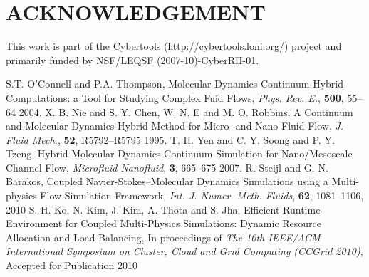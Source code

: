 \documentclass{CFD2010paper}
\begin{document}
\section*{ACKNOWLEDGEMENT}
This work is part of the Cybertools (\underline {http://cybertools.loni.org/}) project and primarily funded by NSF/LEQSF (2007-10)-CyberRII-01.


\begin{thebibliography}{99}



 S.T. O'Connell and P.A. Thompson, Molecular Dynamics Continuum Hybrid Computations: a Tool for Studying Complex Fuid Flows, \textit{Phys. Rev. E.}, \textbf{500}, 55--64 {2004}.
 X. B. Nie and S. Y. Chen, W. N. E and M. O. Robbins, A Continuum and Molecular Dynamics Hybrid Method for Micro- and Nano-Fluid Flow, \textit{J. Fluid Mech.}, \textbf{52}, R5792--R5795 {1995}.
 T. H. Yen and C. Y. Soong and P. Y. Tzeng, Hybrid Molecular Dynamics-Continuum Simulation for Nano/Mesoscale Channel Flow, \textit{Microfluid Nanofluid}, \textbf{3}, 665--675 {2007}.
 R. Steijl and G. N. Barakos, Coupled Navier-Stokes--Molecular Dynamics Simulations using a Multi-physics Flow Simulation Framework, \textit{Int. J. Numer. Meth. Fluids}, \textbf{62}, 1081--1106, {2010}
 S.-H. Ko, N. Kim, J. Kim, A. Thota and S. Jha, Efficient Runtime Environment for Coupled Multi-Physics Simulations: Dynamic Resource Allocation and Load-Balancing, In proceedings of \textit{The 10th IEEE/ACM International Symposium on Cluster, Cloud and Grid Computing (CCGrid 2010)}, Accepted for Publication {2010}


\end{thebibliography}
\end{document}
